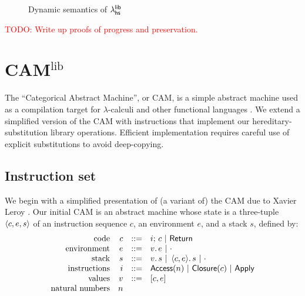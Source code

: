 \documentclass[11pt]{article}
\newcommand{\todo}[1]{\textcolor{red}{\small TODO: #1}}
\begin{document}
\begin{figure}
  \caption{Dynamic semantics of $\lambda^{\textsf{lib}}_{\textsf{hs}}$}
  \label{fig:llhsdynsem}
\end{figure}

\todo{Write up proofs of progress and preservation.}


\newcommand{\camlib}{CAM\ensuremath{^{\text{lib}}}}
\section{\camlib{}}

The ``Categorical Abstract Machine'', or CAM, is a simple abstract machine used
as a compilation target for $\lambda$-calculi and other functional languages
\cite{cam87}. We extend a simplified version of the CAM with instructions that
implement our hereditary-substitution library operations. Efficient
implementation requires careful use of explicit substitutions to avoid
deep-copying.

\subsection{Instruction set}

\newcommand{\semi}{;\,}
\newcommand{\cons}{.\,}
\newcommand{\nil}{\cdot}
\newcommand{\Access}[1]{\ms{Access}(#1)}
\newcommand{\Closure}[1]{\ms{Closure}(#1)}
\newcommand{\Apply}{\ms{Apply}}
\newcommand{\Return}{\ms{Return}}

We begin with a simplified presentation of (a variant of) the CAM due to Xavier
Leroy \cite{leroyzam05}. Our initial CAM is an abstract machine whose state is a
three-tuple $\left\langle c,e,s\right\rangle$ of an instruction sequence $c$, an environment $e$, and
a stack $s$, defined by:
\[\begin{array}{rrcl}
  \text{code} & c &::=& i \semi c ~|~ \Return\\
  \text{environment} & e &::=& v \cons e ~|~ \nil\\
  \text{stack} & s &::=& v \cons s ~|~ \<c,e\>\! \cons s ~|~ \nil\\
  \text{instructions} & i &::=& \Access{n} ~|~ \Closure{c} ~|~ \Apply\\
  \text{values} & v &::=& [c,e]\\
  \text{natural numbers} & n\\
\end{array}\]
\end{document}

